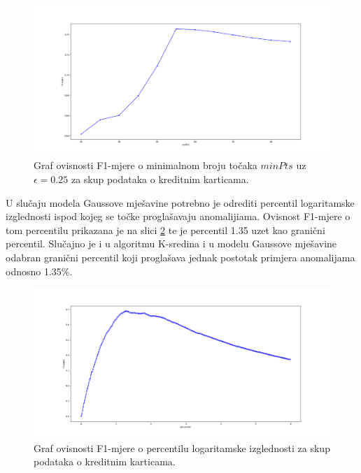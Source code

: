 \documentclass[utf8, diplomski, numeric]{fer}
\begin{document}
\begin{figure}[htb]
\includegraphics[width=1\textwidth]{images/credit-dbscan-f1.png}
\centering
\caption{Graf ovisnosti F1-mjere o minimalnom broju točaka $minPts$ uz $\epsilon = 0.25$ za skup podataka o kreditnim karticama.}
\label{fig:credit-dbscan}
\end{figure}

U slučaju modela Gaussove mješavine potrebno je odrediti percentil logaritamske izglednosti ispod kojeg se točke proglašavaju anomalijiama. Ovisnost F1-mjere o tom percentilu prikazana je na slici \ref{fig:credit-gauss} te je percentil 1.35 uzet kao granični percentil. Slučajno je i u algoritmu K-sredina i u modelu Gaussove mješavine odabran granični percentil koji proglašava jednak postotak primjera anomalijama odnosno 1.35\%.

\begin{figure}[htb]
\includegraphics[width=1\textwidth]{images/credit-gauss-f1.png}
\centering
\caption{Graf ovisnosti F1-mjere o percentilu logaritamske izglednosti za skup podataka o kreditnim karticama.}
\label{fig:credit-gauss}
\end{figure}
\end{document}
